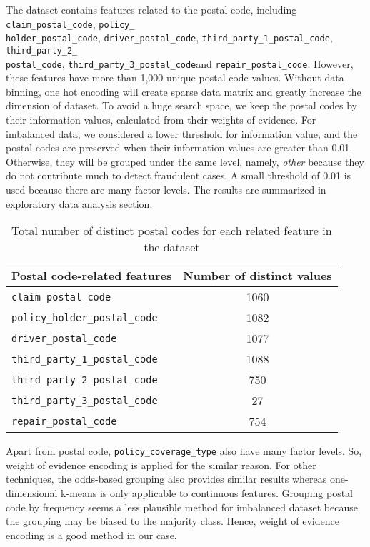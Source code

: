 \documentclass[12pt]{article}
\begin{document}
The dataset contains features related to the postal code, including \texttt{claim\_postal\_code}, \texttt{policy\_\\holder\_postal\_code}, \texttt{driver\_postal\_code}, \texttt{third\_party\_1\_postal\_code}, \texttt{third\_party\_2\_\\postal\_code}, \texttt{third\_party\_3\_postal\_code}and \texttt{repair\_postal\_code}. However, these features have more than 1,000 unique postal code values. Without data binning, one hot encoding will create sparse data matrix and greatly increase the dimension of dataset. To avoid a huge search space, we keep the postal codes by their information values, calculated from their weights of evidence. For imbalanced data, we considered a lower threshold for information value, and the postal codes are preserved when their information values are greater than 0.01. Otherwise, they will be grouped under the same level, namely, \textit{other} because they do not contribute much to detect fraudulent cases. A small threshold of 0.01 is used because there are many factor levels.  The results are summarized in exploratory data analysis section.\\

\begin{table}[h]
	\centering
	\begin{tabular}{|l|c|}
	\hline
	Postal code-related features & Number of distinct values \\
	\hline
	\texttt{claim\_postal\_code} & 1060 \\
	\texttt{policy\_holder\_postal\_code} & 1082 \\
	\texttt{driver\_postal\_code} & 1077 \\
	\texttt{third\_party\_1\_postal\_code} & 1088 \\
	\texttt{third\_party\_2\_postal\_code} & 750 \\
	\texttt{third\_party\_3\_postal\_code} & 27 \\
	\texttt{repair\_postal\_code} & 754 \\
	\hline
	\end{tabular}
	\caption{Total number of distinct postal codes for each related feature in the dataset}
\end{table}

Apart from postal code, \texttt{policy\_coverage\_type} also have many factor levels. So, weight of evidence encoding is applied for the similar reason. For other techniques, the odds-based grouping also provides similar results whereas one-dimensional k-means is only applicable to continuous features. Grouping postal code by frequency seems a less plausible method for imbalanced dataset because the grouping may be biased to the majority class. Hence, weight of evidence encoding is a good method in our case. \\
\end{document}
